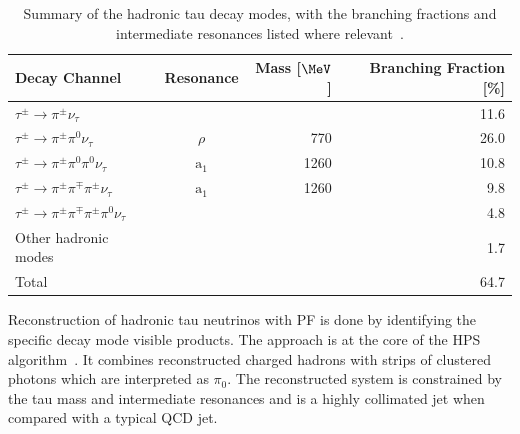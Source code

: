 \begin{table}[!htb]
\begin{tabular}{|l|c|r|r|}
\hline
Decay Channel & Resonance & Mass [$\MeV$] & Branching Fraction [\%] \\
\hline\hline
$\tau^{\pm} \rightarrow \pi^{\pm} \nu_\tau$                              &                &      & 11.6 \\
$\tau^{\pm} \rightarrow \pi^{\pm} \pi^{0}   \nu_\tau$                    & $\rho$         &  770 & 26.0 \\
$\tau^{\pm} \rightarrow \pi^{\pm} \pi^{0}   \pi^{0}   \nu_\tau$          & $\text{a}_{1}$ & 1260 & 10.8 \\
$\tau^{\pm} \rightarrow \pi^{\pm} \pi^{\mp} \pi^{\pm} \nu_\tau$          & $\text{a}_{1}$ & 1260 &  9.8 \\
$\tau^{\pm} \rightarrow \pi^{\pm} \pi^{\mp} \pi^{\pm} \pi^{0} \nu_\tau$  &                &      &  4.8 \\
\hline
Other hadronic modes                                                     &                &      &  1.7 \\
\hline\hline
Total & &  & 64.7 \\
\hline
\end{tabular}
\caption[Summary of the hadronic tau decay modes.]{Summary of the hadronic tau decay modes, with the branching fractions and intermediate resonances listed where relevant~\cite{ARTICLE:PDG}.}
\label{TABLE:EventReconstructionAndSimulation_TauDecays}
\end{table}

Reconstruction of hadronic tau neutrinos with \gls{PF} is done by identifying the specific decay mode visible products. The approach is at the core of the \gls{HPS} algorithm~\cite{ARTICLE:CMSPerformaceOfTauLeptonReconstruction,ARTICLE:CMSReconstructionIndentificationTau}. It combines reconstructed charged hadrons with strips of clustered photons which are interpreted as $\pi_0$. The reconstructed system is constrained by the tau mass and intermediate resonances and is a highly collimated jet when compared with a typical \gls{QCD} jet.

